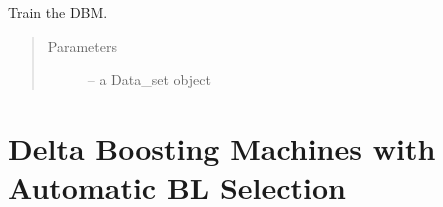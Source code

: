 \documentclass[letterpaper,10pt,english]{sphinxmanual}
\begin{document}
\begin{fulllineitems}

\begin{fulllineitems}
\label{\detokenize{index:dbm_py.interface.DBM.train}}
Train the DBM.
\begin{quote}\begin{description}
\item[{Parameters}] \leavevmode
{} -- a Data\_set object

\end{description}\end{quote}

\end{fulllineitems}


\end{fulllineitems}



\section{Delta Boosting Machines with Automatic BL Selection}
\label{\detokenize{index:delta-boosting-machines-with-automatic-bl-selection}}
\end{document}
